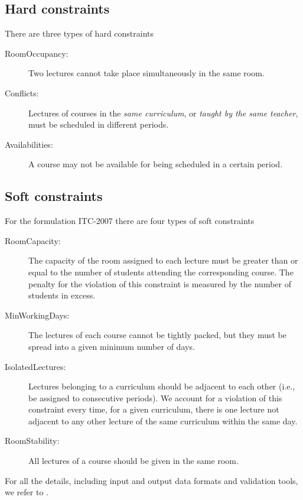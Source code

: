 \documentclass[authoryear,12pt]{article}
\begin{document}
\subsection{Hard constraints}

There are three types of hard constraints

\begin{description}
\item[\textsf{RoomOccupancy}:] Two lectures cannot take place simultaneously in
  the same room.
\item[\textsf{Conflicts}:] Lectures of courses in the \emph{same curriculum},
  or \emph{taught by the same teacher}, must be scheduled in different periods.
\item[\textsf{Availabilities}:] A course may not be available for being scheduled
  in a certain period.
\end{description}

\subsection{Soft constraints}

For the formulation ITC-2007 there are four types of soft constraints

\begin{description}
\item[\textsf{RoomCapacity}:] The capacity of the
  room assigned to each lecture must be greater than or equal to the number of
  students attending the corresponding course. The penalty for the violation of
  this constraint is measured by the number of students in excess.

\item[\textsf{MinWorkingDays}:] The lectures of each course cannot be
  tightly packed, but they must be spread into a given minimum number of days.

\item[\textsf{IsolatedLectures}:] Lectures belonging to a curriculum
  should be adjacent to each other (i.e., be assigned to consecutive periods).
  We account for a violation of this constraint every time, for a given
  curriculum, there is one lecture not adjacent to any other lecture of the same
  curriculum within the same day.

\item[\textsf{RoomStability}:] All lectures of a course should be given
  in the same room.
\end{description}

For all the details, including  input and output data formats and validation
tools, we refer to \citep{DiMS07}.
\end{document}
